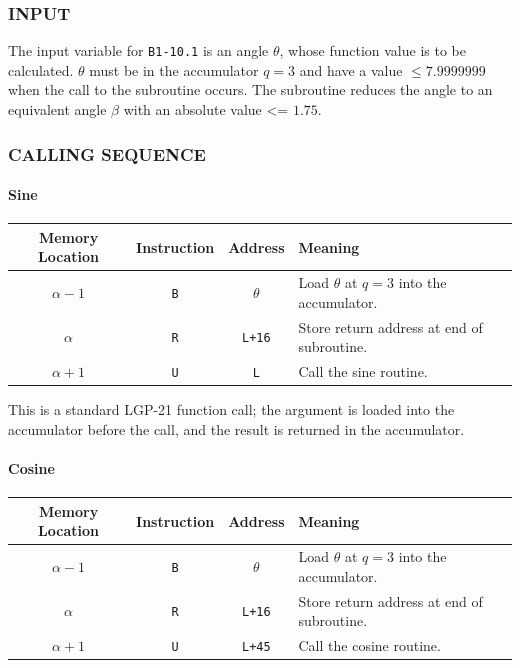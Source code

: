 \subsubsection*{INPUT}
The input variable for \texttt{B1-10.1} is an angle $\theta$, whose function value is to be calculated. $\theta$ must be in the accumulator $q=3$ and have a value $\le 7.9999999$ when the call to the subroutine occurs. The subroutine reduces the angle to an equivalent angle $\beta$ with an absolute value <= $1.75$.

\subsubsection*{CALLING SEQUENCE}
\paragraph{Sine}
\begin{table}[h!]
\centering
\begin{tabularx}{\textwidth}{cccX}
\toprule
\textbf{Memory Location} & \textbf{Instruction} & \textbf{Address} & \textbf{Meaning} \\
\midrule
$\alpha-1$      & \texttt{B}            & $\theta$       & Load $\theta$ at $q=3$ into the accumulator.\\
$\alpha$      & \texttt{R}            & \texttt{L+16}    & Store return address at end of subroutine.\\
$\alpha+1$      & \texttt{U}            & \texttt{L}       & Call the sine routine.\\
\bottomrule
\end{tabularx}
\end{table}

This is a standard LGP-21 function call; the argument is loaded into the accumulator before the call, and the result is returned in the accumulator.

\paragraph{Cosine}
\begin{table}[h!]
\centering
\begin{tabularx}{\textwidth}{cccX}
\toprule
\textbf{Memory Location} & \textbf{Instruction} & \textbf{Address} & \textbf{Meaning} \\
\midrule
$\alpha-1$      & \texttt{B}            & $\theta$       & Load $\theta$ at $q=3$ into the accumulator.\\
$\alpha$      & \texttt{R}            & \texttt{L+16}    & Store return address at end of subroutine.\\
$\alpha+1$      & \texttt{U}            & \texttt{L+45}       & Call the cosine routine.\\
\bottomrule
\end{tabularx}
\end{table}

